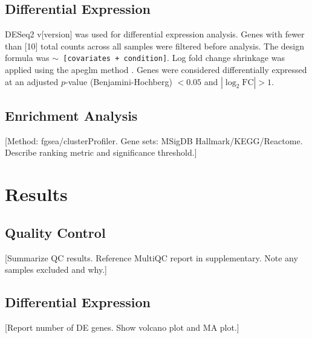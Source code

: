 \documentclass[11pt,a4paper]{article}
\begin{document}
\subsection{Differential Expression}

DESeq2 v[version] \citep{Love2014} was used for differential expression analysis.
Genes with fewer than [10] total counts across all samples were filtered before
analysis. The design formula was \texttt{$\sim$ [covariates + condition]}.
Log fold change shrinkage was applied using the apeglm method \citep{Zhu2019}.
Genes were considered differentially expressed at an adjusted $p$-value (Benjamini-Hochberg)
$< 0.05$ and $|\log_2\text{FC}| > 1$.

\subsection{Enrichment Analysis}

[Method: fgsea/clusterProfiler. Gene sets: MSigDB Hallmark/KEGG/Reactome.
Describe ranking metric and significance threshold.]

\section{Results}

\subsection{Quality Control}

[Summarize QC results. Reference MultiQC report in supplementary. Note any
samples excluded and why.]


\subsection{Differential Expression}

[Report number of DE genes. Show volcano plot and MA plot.]

\end{document}
